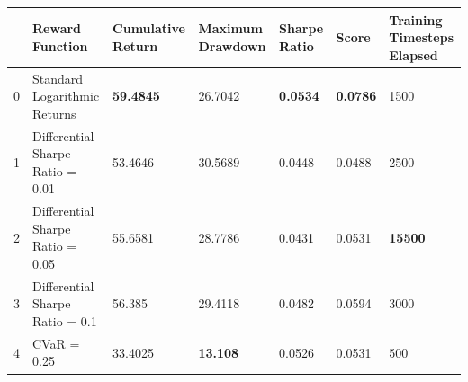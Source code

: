 \begin{tabular}{lllllll}
\toprule
 & Reward Function & Cumulative Return & Maximum Drawdown & Sharpe Ratio & Score & Training Timesteps Elapsed \\
\midrule
0 & Standard Logarithmic Returns & \textbf{59.4845} & 26.7042 & \textbf{0.0534} & \textbf{0.0786} & 1500 \\
1 & Differential Sharpe Ratio = 0.01 & 53.4646 & 30.5689 & 0.0448 & 0.0488 & 2500 \\
2 & Differential Sharpe Ratio = 0.05 & 55.6581 & 28.7786 & 0.0431 & 0.0531 & \textbf{15500} \\
3 & Differential Sharpe Ratio = 0.1 & 56.385 & 29.4118 & 0.0482 & 0.0594 & 3000 \\
4 & CVaR = 0.25 & 33.4025 & \textbf{13.108} & 0.0526 & 0.0531 & 500 \\
\bottomrule
\end{tabular}
